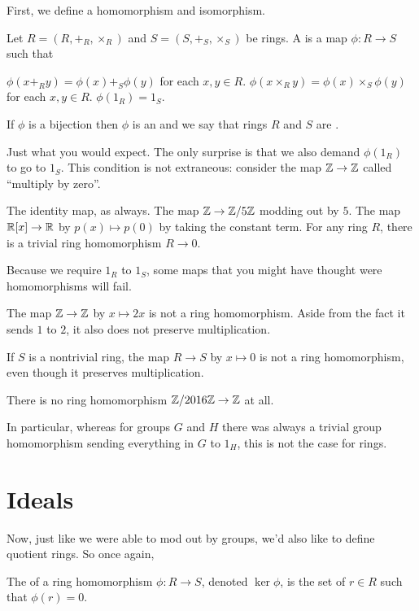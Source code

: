 First, we define a homomorphism and isomorphism.
\begin{definition}
	Let $R = (R, +_R, \times_R)$ and $S = (S, +_S, \times_S)$ be rings.
	A  is a map $\phi \colon R \to S$
	such that
	\begin{enumerate}[(i)]
		\ii $\phi(x +_R y) = \phi(x) +_S \phi(y)$ for each $x,y \in R$.
		\ii $\phi(x \times_R y) = \phi(x) \times_S \phi(y)$ for each $x,y \in R$.
		\ii $\phi(1_R) = 1_S$.
	\end{enumerate}
	If $\phi$ is a bijection then $\phi$ is an 
	and we say that rings $R$ and $S$ are .
\end{definition}
Just what you would expect.
The only surprise is that we also demand $\phi(1_R)$ to go to $1_S$.
This condition is not extraneous:
consider the map $\mathbb Z \to \mathbb Z$ called ``multiply by zero''.
\begin{example}
	\listhack
	\begin{enumerate}[(a)]
		\ii The identity map, as always.
		\ii The map $\mathbb Z \to \mathbb Z/5\mathbb Z$ modding out by $5$.
		\ii The map $\mathbb R[x] \to \mathbb R$ by $p(x) \mapsto p(0)$
		by taking the constant term.
		\ii For any ring $R$, there is a trivial ring homomorphism $R \to 0$.
	\end{enumerate}
\end{example}
\begin{example}
	Because we require $1_R$ to $1_S$, some maps that you
	might have thought were homomorphisms will fail.
	\begin{enumerate}[(a)]
		\ii The map $\mathbb Z \to \mathbb Z$ by $x \mapsto 2x$
		is not a ring homomorphism.
		Aside from the fact it sends $1$ to $2$,
		it also does not preserve multiplication.

		\ii If $S$ is a nontrivial ring,
		the map $R \to S$ by $x \mapsto 0$ is not
		a ring homomorphism, even though it preserves multiplication.

		\ii There is no ring homomorphism $\mathbb Z/2016\mathbb Z \to \mathbb Z$ at all.
	\end{enumerate}
	In particular, whereas for groups $G$ and $H$
	there was always a trivial group homomorphism sending
	everything in $G$ to $1_H$, this is not the case for rings.
\end{example}

\section{Ideals}
Now, just like we were able to mod out by groups,
we'd also like to define quotient rings.
So once again,
\begin{definition}
	The  of a ring homomorphism $\phi \colon R \to S$,
	denoted $\ker \phi$, is the set of $r \in R$ such that $\phi(r) = 0$.
\end{definition}


